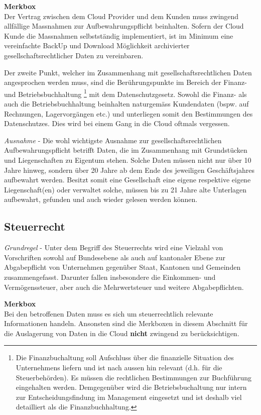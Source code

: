 \documentclass[a4paper,pointlessnumbers]{scrreprt}
\newcommand{\merkbox}[2][0.8\textwidth]{ \begin{center} \begin{tcolorbox}[enhanced, drop fuzzy midday shadow, width={#1}, opacityframe=0.5, colframe=BrickRed, colback=white] {\ECFTeenSpirit \color{BrickRed}\textbf{Merkbox} \qquad {\tiny das gilt es zu beachten}} \\  #2 \end{tcolorbox} \end{center}}
\begin{document}
\merkbox[0.7\textwidth]{Der Vertrag zwischen dem Cloud Provider und dem Kunden muss zwingend allfällige Massnahmen zur Aufbewahrungspflicht beinhalten. Sofern der Cloud Kunde die Massnahmen selbstständig implementiert, ist im Minimum eine vereinfachte BackUp und Download Möglichkeit archivierter gesellschaftsrechtlicher Daten zu vereinbaren.}

Der zweite Punkt, welcher im Zusammenhang mit gesellschaftsrechtlichen Daten angesprochen werden muss, sind die Berührungspunkte im Bereich der Finanz- und Betriebsbuchhaltung \footnote{Die Finanzbuchaltung soll Aufschluss über die finanzielle Situation des Unternehmens liefern und ist nach aussen hin relevant (d.h. für die Steuerbehörden). Es müssen die rechtlichen Bestimmungen zur Buchführung eingehalten werden. Demgegenüber wird die Betriebsbuchaltung nur intern zur Entscheidungsfindung im Management eingesetzt und ist deshalb viel detailliert als die Finanzbuchhaltung.} mit dem Datenschutzgesetz. Sowohl die Finanz- als auch die Betriebsbuchhaltung beinhalten naturgemäss Kundendaten (bspw. auf Rechnungen, Lagervorgängen etc.) und unterliegen somit den Bestimmungen des Datenschutzes. Dies wird bei einem Gang in die Cloud oftmals vergessen.

\textit{Ausnahme} - Die wohl wichtigste Ausnahme zur gesellschaftsrechtlichen Aufbewahrungspflicht betrifft Daten, die im Zusammenhang mit Grundstücken und Liegenschaften zu Eigentum stehen. Solche Daten müssen nicht nur über 10 Jahre hinweg, sondern über 20 Jahre ab dem Ende des jeweiligen Geschäftsjahres aufbewahrt werden. Besitzt somit eine Gesellschaft eine eigene respektive eigene Liegenschaft(en) oder verwaltet solche, müssen bis zu 21 Jahre alte Unterlagen aufbewahrt, gefunden und auch wieder gelesen werden können.

\subsection{Steuerrecht}
\textit{Grundregel} - Unter dem Begriff des Steuerrechts wird eine Vielzahl von Vorschriften sowohl auf Bundesebene als auch auf kantonaler Ebene zur Abgabepflicht von Unternehmen gegenüber Staat, Kantonen und Gemeinden zusammengefasst. Darunter fallen insbesondere die Einkommen- und Vermögenssteuer, aber auch die Mehrwertsteuer und weitere Abgabepflichten.

\merkbox[0.7\textwidth]{Bei den betroffenen Daten muss es sich um steuerrechtlich relevante Informationen handeln. Ansonsten sind die Merkboxen in diesem Abschnitt für die Auslagerung von Daten in die Cloud \textbf{nicht} zwingend zu berücksichtigen.}
\end{document}
